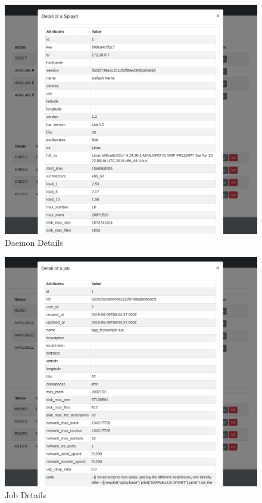 \documentclass{eplmastersthesis}
\begin{document}
        \begin{figure}
          \centering
          \includegraphics[scale=0.55]{figures/daemondetails.png}
          \caption{\label{daemon_details} Daemon Details}
        \end{figure}

        \begin{figure}
          \centering
          \includegraphics[scale=0.55]{figures/jobdetails.png}
          \caption{\label{job_details} Job Details}
        \end{figure}
\end{document}
